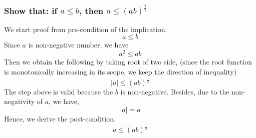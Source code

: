 \documentclass[11pt,a4paper]{article}
\newcommand{\htab}{\hspace*{0.63cm}}
\begin{document}
\subsubsection{Show that: if $a \leq b$, then $ a \leq (ab)^{\frac{1}{2}} $}
\htab We start proof from pre-condition of the implication.
    \begin{equation}    a \leq b    \end{equation}
\htab Since $a$ is non-negative number, we have 
    \begin{equation}    a^{2} \leq ab   \end{equation}
\htab Then we obtain the following by taking root of two side, (since the root function is monotonically increasing in its scope, we keep the direction of inequality)
    \begin{equation}    |a| \leq (ab)^{\frac{1}{2}}     \end{equation}
\htab The step above is valid because the $b$ is non-negative. Besides, due to the non-negativity of $a$, we have,
    \begin{equation}    |a| = a    \end{equation}
\htab Hence, we derive the post-condition.
    \begin{equation} \label{lb:inequality} a \leq (ab)^{\frac{1}{2}} \end{equation}
\end{document}
